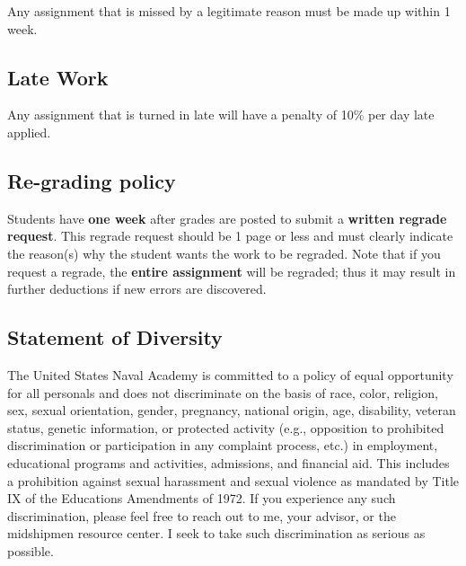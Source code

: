 \documentclass[letterpaper,hidelinks,oneside,11pt]{article}%
\begin{document}
Any assignment that is missed by a legitimate reason must be made up within 1 week.

\subsection*{Late Work}

Any assignment that is turned in late will have a penalty of 10\% per day late applied. 


\subsection*{Re-grading policy}
Students have \textbf{one week} after grades are posted to submit a \textbf{written regrade request}. This regrade request should be 1 page or less and must clearly indicate the reason(s) why the student wants the work to be regraded. Note that if you request a regrade, the \textbf{entire assignment} will be regraded; thus it may result in further deductions if new errors are discovered.
 



\subsection*{Statement of Diversity}

The United States Naval Academy is committed to a policy of equal opportunity for all personals and does not discriminate on the basis of race, color, religion, sex, sexual orientation, gender, pregnancy, national origin, age, disability, veteran status, genetic information, or protected activity (e.g., opposition to prohibited discrimination or participation in any complaint process, etc.) in employment, educational programs and activities, admissions, and financial aid. This includes a prohibition against sexual harassment and sexual violence as mandated by Title IX of the Educations Amendments of 1972. If you experience any such discrimination, please feel free to reach out to me, your advisor, or the midshipmen resource center. I seek to take such discrimination as serious as possible.
\end{document}
